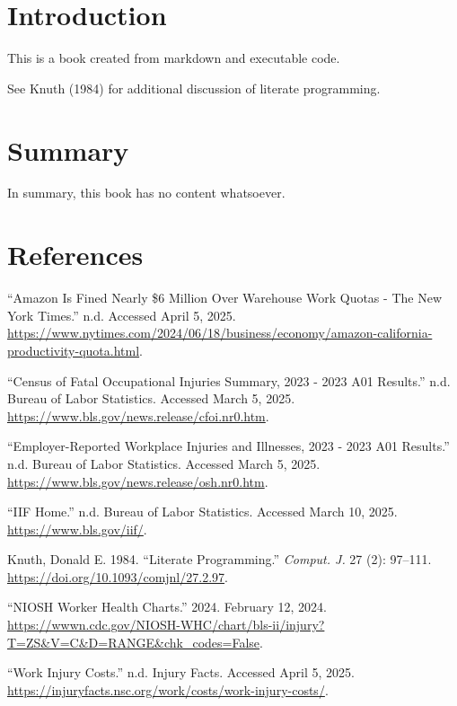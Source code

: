 \documentclass[
  letterpaper,
  DIV=11,
  numbers=noendperiod]{scrreprt}
\newlength{\cslhangindent}
\newenvironment{CSLReferences}[2] %
 {\begin{list}{}{%
  \setlength{\itemindent}{0pt}
  \setlength{\leftmargin}{0pt}
  \setlength{\parsep}{0pt}
  \ifodd #1
   \setlength{\leftmargin}{\cslhangindent}
   \setlength{\itemindent}{-1\cslhangindent}
  \fi
  \setlength{\itemsep}{#2\baselineskip}}}
 {\end{list}}
\begin{document}

\chapter{Introduction}\label{introduction}

This is a book created from markdown and executable code.

See Knuth (1984) for additional discussion of literate programming.


\chapter{Summary}\label{summary}

In summary, this book has no content whatsoever.


\chapter*{References}\label{references}


\label{refs}
\begin{CSLReferences}{1}{0}
{``Amazon {Is Fined Nearly} \$6 {Million Over Warehouse Work Quotas} -
{The New York Times}.''} n.d. Accessed April 5, 2025.
\url{https://www.nytimes.com/2024/06/18/business/economy/amazon-california-productivity-quota.html}.

{``Census of {Fatal Occupational Injuries Summary}, 2023 - 2023 {A01
Results}.''} n.d. Bureau of Labor Statistics. Accessed March 5, 2025.
\url{https://www.bls.gov/news.release/cfoi.nr0.htm}.

{``Employer-{Reported Workplace Injuries} and {Illnesses}, 2023 - 2023
{A01 Results}.''} n.d. Bureau of Labor Statistics. Accessed March 5,
2025. \url{https://www.bls.gov/news.release/osh.nr0.htm}.

{``{IIF Home}.''} n.d. Bureau of Labor Statistics. Accessed March 10,
2025. \url{https://www.bls.gov/iif/}.

Knuth, Donald E. 1984. {``Literate Programming.''} \emph{Comput. J.} 27
(2): 97--111. \url{https://doi.org/10.1093/comjnl/27.2.97}.

{``{NIOSH Worker Health Charts}.''} 2024. February 12, 2024.
\url{https://wwwn.cdc.gov/NIOSH-WHC/chart/bls-ii/injury?T=ZS&V=C&D=RANGE&chk_codes=False}.

{``Work {Injury Costs}.''} n.d. Injury Facts. Accessed April 5, 2025.
\url{https://injuryfacts.nsc.org/work/costs/work-injury-costs/}.

\end{CSLReferences}
\end{document}
